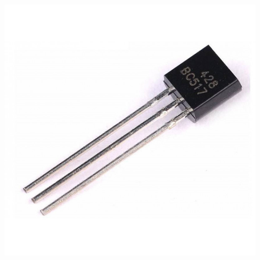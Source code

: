 \documentclass[
  letterpaper,
  DIV=11,
  numbers=noendperiod]{scrreprt}
\begin{document}
\begin{figure}
\begin{minipage}[t]{0.26\linewidth}
{{\includegraphics{generalites/../_resources/bitmap/elec/transistor.jpg}

}

}

\end{minipage}%
%
\begin{minipage}[t]{0.26\linewidth}

{\centering 

}
\end{minipage}
\end{figure}
\end{document}
